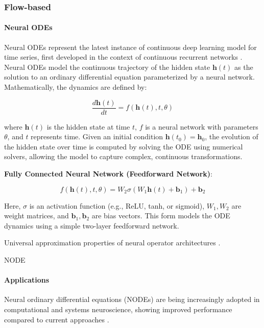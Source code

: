 \documentclass{article}
\theoremstyle{definition} \newtheorem{definition}{Definition}  \newtheorem{example}{Example}
\theoremstyle{remark} \newtheorem{remark}{Remark}
\newcounter{ct}
\begin{document}
\subsubsection{Flow-based}
\paragraph{Neural ODEs}
Neural ODEs \citep{chen2018neural} represent the latest instance of continuous deep learning model for time series, first developed in the context of continuous recurrent networks \citep{cohen1983absolute}.
%
Neural ODEs model the continuous trajectory of the hidden state \( \mathbf{h}(t) \) as the solution to an ordinary differential equation parameterized by a neural network. Mathematically, the dynamics are defined by:

\[
\frac{d \mathbf{h}(t)}{dt} = f(\mathbf{h}(t), t, \theta)
\]

where \( \mathbf{h}(t) \) is the hidden state at time \( t \), \( f \) is a neural network with parameters \( \theta \), and \( t \) represents time. Given an initial condition \( \mathbf{h}(t_0) = \mathbf{h}_0 \), the evolution of the hidden state over time is computed by solving the ODE using numerical solvers, allowing the model to capture complex, continuous transformations.

\textbf{Fully Connected Neural Network (Feedforward Network)}:

\[
f(\mathbf{h}(t), t, \theta) = W_2 \sigma(W_1 \mathbf{h}(t) + \mathbf{b}_1) + \mathbf{b}_2
\]

Here, \( \sigma \) is an activation function (e.g., ReLU, tanh, or sigmoid), \( W_1, W_2 \) are weight matrices, and \( \mathbf{b}_1, \mathbf{b}_2 \) are bias vectors.
 This form models the ODE dynamics using a simple two-layer feedforward network.

Universal approximation properties of neural operator architectures \citep{lu2021learning, kissas2022learning, kovachki2021universal}.

NODE\citep{finlay2020trainnode}
\citep{torchdiffeq}


\paragraph{Applications}
Neural ordinary differential equations (NODEs) are being increasingly adopted in computational and systems neuroscience, showing improved performance compared to current approaches \citep{kim2021inferring,geenjaar2023learning,sedler2023expressive,elgazzar2024universal,rubanova2019latent,coelho2024enhancing}.
\end{document}
